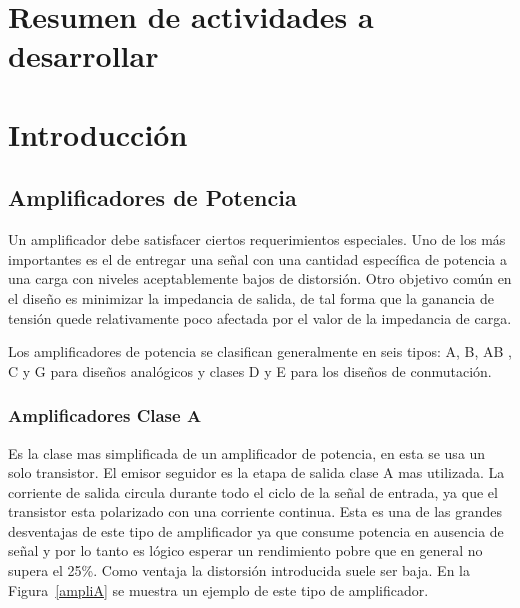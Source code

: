 \documentclass[a4paper,12pt,twoside]{article}
\begin{document}
\section{Resumen de actividades a desarrollar}



















\section{Introducción}
\subsection{Amplificadores de Potencia}

Un amplificador debe satisfacer ciertos requerimientos especiales. Uno de los más importantes es el de entregar una señal con una cantidad específica de potencia a una carga con niveles aceptablemente bajos de distorsión. Otro objetivo común en el diseño es minimizar la impedancia de salida, de tal forma que la ganancia de tensión quede relativamente poco afectada por el valor de la impedancia de carga.

Los amplificadores de potencia  se clasifican generalmente en seis tipos: A, B, AB , C y G para diseños analógicos y clases D y E para los diseños de conmutación. 



\subsubsection*{Amplificadores Clase A}

Es la clase mas simplificada de un amplificador de potencia, en esta se usa un solo transistor. El emisor seguidor es la etapa de salida clase A mas utilizada. La corriente de salida circula durante todo el ciclo de la señal de entrada, ya que el transistor esta polarizado con una corriente continua. Esta es una de las grandes desventajas de este tipo de amplificador ya que consume potencia en ausencia de señal y por lo tanto es lógico esperar un rendimiento pobre que en general no supera el 25\%. Como ventaja la distorsión introducida suele ser baja. En la Figura~\ref{ampliA} se muestra un ejemplo de este tipo de amplificador.
 
\end{document}
